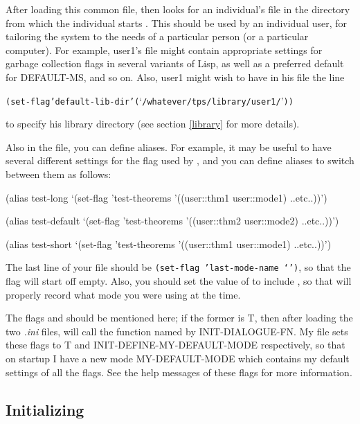 After loading this common  file, {\TPS} then looks for an individual's
 file in the directory from which the individual starts {\TPS}.
This should be used by an individual
user, for tailoring the system to the needs of a particular person (or a
particular computer). For example, user1's  file might contain
appropriate settings for garbage collection flags in several variants of Lisp, as well
as a preferred default for DEFAULT-MS, and so on.
Also, user1 might wish to have in his  file the line
\begin{alltt}
(set-flag 'default-lib-dir '(`/whatever/tps/library/user1/'))
\end{alltt}
to specify his library directory (see section \ref{library} for more details).

Also in the  file, you can define aliases. For example, it may be useful to
have several different settings for the  flag used by ,
and you can define aliases to switch between them as follows:

\begin{tpsexample}
(alias test-long `(set-flag 'test-theorems '((user::thm1  user::mode1) ..etc..))')

(alias test-default `(set-flag 'test-theorems '((user::thm2  user::mode2) ..etc..))')

(alias test-short `(set-flag 'test-theorems '((user::thm1  user::mode1) ..etc..))')
\end{tpsexample}

The last line of your  file should be {\tt (set-flag 'last-mode-name `')}, so that
the flag  will start off empty. Also, you should set the value of
 to include , so that 
will properly record what mode you were using at the time.

The flags  and  should be mentioned
here; if the former is T, then after loading the two {\it .ini} files, {\TPS} will call the
function named by INIT-DIALOGUE-FN. My  file sets these flags to T and
INIT-DEFINE-MY-DEFAULT-MODE respectively, so that on startup I have a new mode
MY-DEFAULT-MODE which contains my default settings of all the flags. See the help messages
of these flags for more information.

\subsection{Initializing {\ETPS}}

